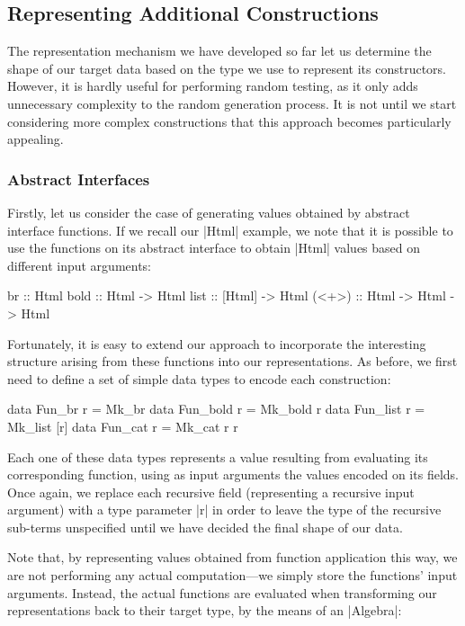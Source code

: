 %
\subsection{Representing Additional Constructions}

The representation mechanism we have developed so far let us determine the shape
of our target data based on the type we use to represent its constructors.
%
However, it is hardly useful for performing random testing, as it only adds
unnecessary complexity to the random generation process.
%
It is not until we start considering more complex constructions that this
approach becomes particularly appealing.

%
%
\subsubsection{Abstract Interfaces}

Firstly, let us consider the case of generating values obtained by abstract
interface functions.
%
If we recall our |Html| example, we note that it is possible to use the
functions on its abstract interface to obtain |Html| values based on different
input arguments:

\begin{code}
br     ::                      Html
bold   ::  Html    ->          Html
list   ::  [Html]  ->          Html
(<+>)  ::  Html    -> Html ->  Html
\end{code}
%
Fortunately, it is easy to extend our approach to incorporate the interesting
structure arising from these functions into our representations.
%
As before, we first need to define a set of simple data types to encode each
construction:

\begin{code}
data Fun_br     r = Mk_br
data Fun_bold   r = Mk_bold r
data Fun_list   r = Mk_list [r]
data Fun_cat    r = Mk_cat  r r
\end{code}
%
Each one of these data types represents a value resulting from evaluating its
corresponding function, using as input arguments the values encoded on its
fields.
%
Once again, we replace each recursive field (representing a recursive input
argument) with a type parameter |r| in order to leave the type of the recursive
sub-terms unspecified until we have decided the final shape of our data.


Note that, by representing values obtained from function application this way,
we are not performing any actual computation---we simply store the functions'
input arguments.
%
Instead, the actual functions are evaluated when transforming our
representations back to their target type, by the means of an |Algebra|:

